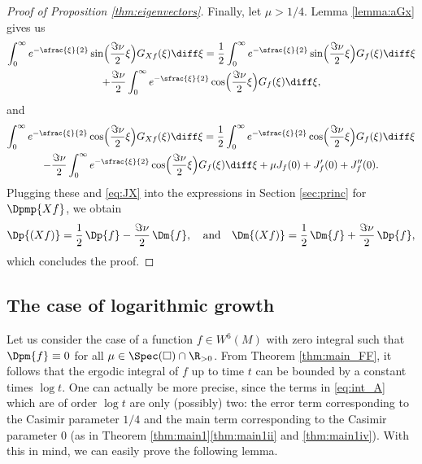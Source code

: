 \begin{proof}[{Proof of Proposition \ref{thm:eigenvectors}}]
Finally, let $\mu > 1/4$. Lemma \ref{lemma:aGx} gives us
\begin{multline*}
\int_0^\infty e^{-\sfrac{\xi}{2}} \sin\Bigl(\frac{\Im\nu}{2}\xi \Bigr) G_{Xf}(\xi) \diff \xi = \frac{1}{2} \int_0^\infty e^{-\sfrac{\xi}{2}} \sin\Bigl(\frac{\Im\nu}{2}\xi \Bigr) G_{f}(\xi) \diff \xi \\
+ \frac{\Im\nu}{2}\int_0^\infty e^{-\sfrac{\xi}{2}} \cos\Bigl(\frac{\Im\nu}{2}\xi \Bigr) G_{f}(\xi) \diff \xi,
\end{multline*}
and
\begin{multline*}
\int_0^\infty e^{-\sfrac{\xi}{2}} \cos\Bigl(\frac{\Im\nu}{2}\xi \Bigr) G_{Xf}(\xi) \diff \xi = \frac{1}{2} \int_0^\infty e^{-\sfrac{\xi}{2}} \cos\Bigl(\frac{\Im\nu}{2}\xi \Bigr) G_{f}(\xi) \diff \xi \\
 - \frac{\Im \nu}{2}\int_0^\infty e^{-\sfrac{\xi}{2}} \cos\Bigl(\frac{\Im\nu}{2}\xi \Bigr) G_{f}(\xi) \diff \xi + \mu J_f(0) + J_f'(0)+ J_f''(0).
\end{multline*}
Plugging these and \eqref{eq:JX} into the expressions in Section \ref{sec:princ} for $\Dpmp{Xf}$, we obtain
\[
\Dp{(Xf)}= \frac{1}{2}\, \Dp{f} - \frac{\Im\nu}{2}\, \Dm{f}, \quad\text{and}\quad \Dm{(Xf)}= \frac{1}{2}\, \Dm{f} + \frac{\Im\nu}{2}\, \Dp{f},
\]
which concludes the proof.
\end{proof}

\subsection{The case of logarithmic growth}\label{sec:log_growth}

Let us consider the case of a function $f \in W^6(M)$ with zero integral such that $\Dpm{f} \equiv 0$ for all $\mu \in \Spec(\square) \cap \R_{>0}$.
From Theorem \ref{thm:main_FF}, it follows that the ergodic integral of $f$ up to time $t$ can be bounded by a constant times $\log t$.
One can actually be more precise, since the terms in \eqref{eq:int_A} which are of order $\log t$ are only (possibly) two: the error term corresponding to the Casimir parameter $1/4$ and the main term corresponding to the Casimir parameter 0 (as in Theorem \ref{thm:main1}\eqref{thm:main1ii} and \eqref{thm:main1iv}). With this in mind, we can easily prove the following lemma.

